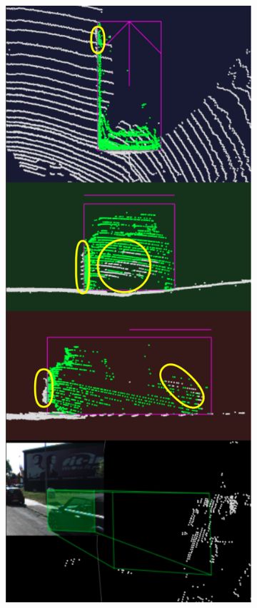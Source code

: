 \documentclass[letterpaper, 10 pt, conference]{ieeeconf}  %
\begin{document}
\begin{figure}
	~
	\begin{subfigure}{0.3\linewidth}
		\includegraphics[scale=0.2]{./figures/annocheck-1}
		\caption{}
	\end{subfigure}
	~
	\begin{subfigure}{0.3\linewidth}

\end{subfigure}
\end{figure}
\end{document}
